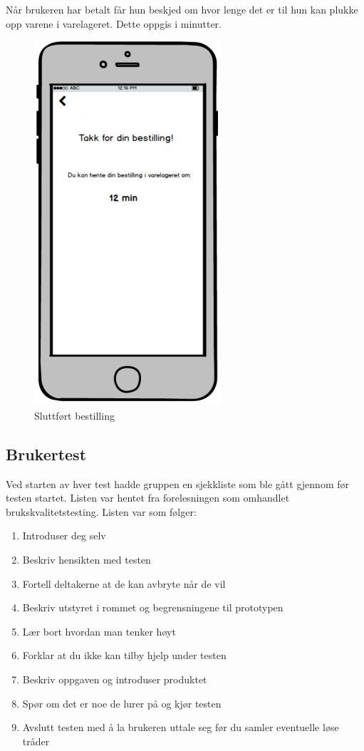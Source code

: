 \noindent Når brukeren har betalt får hun beskjed om hvor lenge det er til hun kan plukke opp varene i varelageret. Dette oppgis i minutter.

\begin{figure}[H]
\includegraphics[scale=0.5]{images/prototype1/sluttfortbestilling}
\centering %
\caption{Sluttført bestilling}
\label{fig:sluttfortbestilling}
\end{figure}

\subsection{Brukertest}
Ved starten av hver test hadde gruppen en sjekkliste som ble gått gjennom før testen startet. Listen var hentet fra forelesningen som omhandlet brukskvalitetstesting\cite{brukskvalitetstesting}. Listen var som følger: 

\begin{enumerate}
    \item Introduser deg selv
    \item Beskriv hensikten med testen
    \item Fortell deltakerne at de kan avbryte når de vil
    \item Beskriv utstyret i rommet og begrensningene til prototypen
    \item Lær bort hvordan man tenker høyt 
    \item Forklar at du ikke kan tilby hjelp under testen
    \item Beskriv oppgaven og introduser produktet
    \item Spør om det er noe de lurer på og kjør testen
    \item Avslutt testen med å la brukeren uttale seg før du samler eventuelle løse tråder
\end{enumerate}

